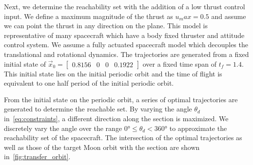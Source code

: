 \documentclass[preprint]{elsarticle}
\begin{document}
Next, we determine the reachability set with the addition of a low thrust control input.
We define a maximum magnitude of the thrust as \( u_max = 0.5 \) and assume we can point the thrust in any direction on the plane. 
This model is representative of many spacecraft which have a body fixed thruster and attitude control system.
We assume a fully actuated spacecraft model which decouples the translational and rotational dynamics.
The trajectories are generated from a fixed initial state of \( \vec{x}_0 = \begin{bmatrix}0.8156 & 0 & 0 & 0.1922 \end{bmatrix} \) over a fixed time span of \( t_f = 1.4 \).
This initial state lies on the initial periodic orbit and the time of flight is equivalent to one half period of the initial periodic orbit. 

From the initial state on the periodic orbit, a series of optimal trajectories are generated to determine the reachable set.
By varying the angle \( \theta_d\) in~\cref{eq:constraints}, a different direction along the \Poincare section is maximized. 
We discretely vary the angle over the range \( \ang{0} \leq \theta_d < \ang{360} \) to approximate the reachability set of the spacecraft.
The intersection of the optimal trajectories as well as those of the target Moon orbit with the \Poincare section are shown in~\cref{fig:transfer_orbit}.
\end{document}
